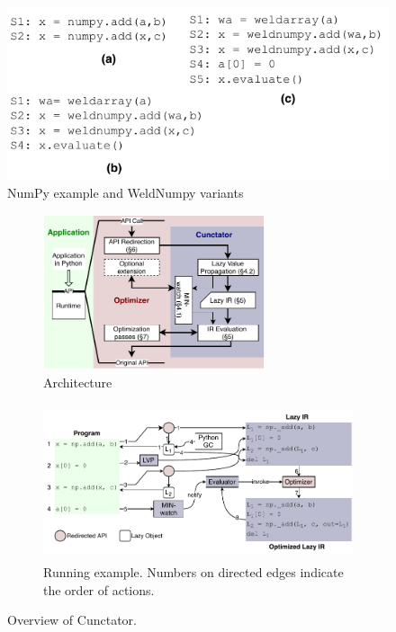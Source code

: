 \documentclass[sigconf]{acmart}\settopmatter{printfolios=true,printccs=false,printacmref=false}\setcopyright{none}
\begin{document}
\begin{figure}
    \centering
    \includegraphics[width=\columnwidth]{figure/addExample.pdf}
    \caption{NumPy example and WeldNumpy variants}
    \label{fig:addEx}
\end{figure}
\begin{figure}[t!]
    \centering
    \begin{subfigure}[c]{0.3\textwidth}
        \centering
        \includegraphics[height=1.8in]{figure/Overview.pdf}
        \caption{Architecture}
        \label{fig:architecture}
    \end{subfigure}
    \hfill
    \begin{subfigure}[c]{0.6\textwidth}
        \centering
        \includegraphics[height=1.8in]{figure/running_example.pdf}
        \caption{Running example. Numbers on directed edges indicate the order of actions.}
        \label{fig:running_example}
    \end{subfigure}
    \caption{Overview of Cunctator.}
    \label{fig:overview}
\end{figure}
\end{document}
